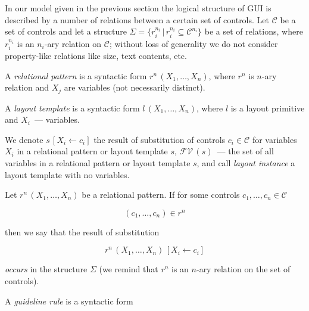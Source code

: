 

In our model given in the previous section the logical structure of GUI is described by
a number of relations between a certain set of controls. Let $\mathcal{C}$ be a set of
controls and let a structure $\Sigma=\{r^{n_i}_i\, |\, r^{n_i}_i\subseteq\mathcal{C}^{n_i}\}$ be a set of
relations, where $r^{n_i}_i$ is an \mbox{$n_i$-ary} relation on $\mathcal{C}$; without loss
of generality we do not consider property-like relations like size, text contents, etc.

A \emph{relational pattern} is a syntactic form $r^n\,(X_1,\dots,X_n)$, where $r^n$ is $n$-ary
relation and $X_j$ are variables (not necessarily distinct).

A \emph{layout template} is a syntactic form $l\,(X_1,\dots,X_n)$, where $l$ is a layout primitive and
$X_i$~--- variables.


We denote $s\,[X_i\gets c_i]$ the result of substitution of controls $c_i\in\mathcal{C}$
for variables $X_i$ in a relational pattern or layout template $s$, $\mathcal{FV}\,(s)$~--- the set of all
variables in a relational pattern or layout template $s$, and call \emph{layout instance} a layout
template with no variables.

Let $r^n\,(X_1,\dots,X_n)$ be a relational pattern. If for some controls $c_1,\dots,c_n\in\mathcal{C}$

\[
(c_1,\dots,c_n)\in r^n
\]

\noindent  then we say that the result of substitution

\[
r^n\,(X_1,\dots,X_n)\,[X_i\gets c_i]
\]

\noindent \emph{occurs} in the structure $\Sigma$ (we remind that $r^n$ is an $n$-ary relation on the set of controls).


A \emph{guideline rule} is a syntactic form


